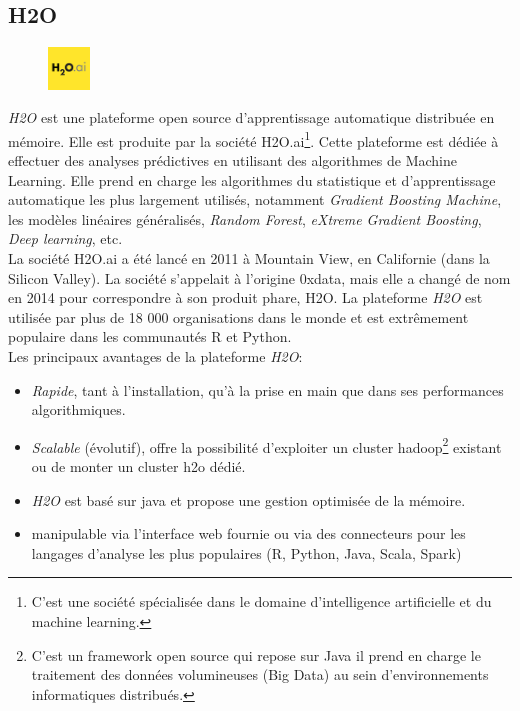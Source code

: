 \subsection{H2O} \label{defH2O}
\begin{figure}
    \includegraphics[width=0.1\textwidth]{img/h2ologo.png}
\end{figure}
\textit{H2O} est une plateforme open source d'apprentissage automatique distribuée en mémoire. Elle est produite par la société H2O.ai\footnote{C'est une société spécialisée dans le domaine d’intelligence artificielle et du machine learning.}. Cette plateforme est dédiée à effectuer des analyses prédictives en utilisant des algorithmes de Machine Learning. Elle prend en charge les algorithmes du statistique et d’apprentissage automatique les plus largement utilisés, notamment \textit{Gradient Boosting Machine}, les modèles linéaires généralisés, \textit{Random Forest}, \textit{eXtreme Gradient Boosting}, \textit{Deep learning}, etc.\\

La société H2O.ai a été lancé en 2011 à Mountain View, en Californie (dans la Silicon Valley). La société s'appelait à l'origine 0xdata, mais elle a changé de nom en 2014 pour correspondre à son produit phare, H2O. La plateforme \textit{H2O} est utilisée par plus de 18 000 organisations dans le monde et est extrêmement populaire dans les communautés R et Python.\\


Les principaux avantages de la plateforme \textit{H2O}: 
\begin{itemize}
\item[\textbullet] \textit{Rapide}, tant à l’installation, qu’à la prise en main que dans ses performances algorithmiques.
\item[\textbullet] \textit{Scalable} (évolutif), offre la possibilité d’exploiter un cluster hadoop\footnote{C'est un framework open source qui repose sur Java il prend en charge le traitement des données volumineuses (Big Data) au sein d'environnements informatiques distribués.} existant ou de monter un cluster h2o dédié.
\item[\textbullet] \textit{H2O} est basé sur java et propose une gestion optimisée de la mémoire. 
\item[\textbullet] manipulable via l’interface web fournie ou via des connecteurs pour les langages d’analyse les plus populaires (R, Python, Java, Scala, Spark)\\
\end{itemize}

